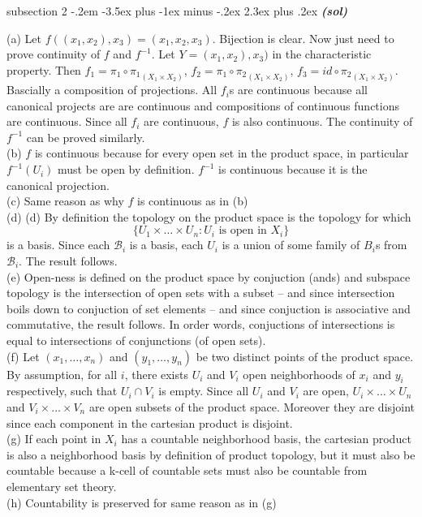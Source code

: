 \documentclass[12pt]{article}
\makeatletter
\newenvironment{s}{\@startsection
       {subsection}
       {2}
       {-.2em}
       {-3.5ex plus -1ex minus -.2ex}
       {2.3ex plus .2ex}
       {\pagebreak[3]%
       \large\bf\noindent\emph{(sol) }
       }
       }
\makeatother
\begin{document}
\begin{s}{3.32}
    (a) Let $f((x_1,x_2),x_3) = (x_1,x_2,x_3)$. Bijection is clear. Now just need to prove continuity 
    of $f$ and $f^{-1}$. Let $Y= (x_1,x_2),x_3)$ in the characteristic property. Then 
    $f_1 = \pi_1 \circ {\pi_1}_{(X_1 \times X_2)}$, $f_2 = \pi_1 \circ {\pi_2}_{(X_1 \times X_2)}$,
    $f_3 = id \circ  {\pi_2}_{(X_1 \times X_2)}$. Bascially a composition of projections.
    All $f_i$s are continuous because all canonical projects are are continuous and compositions of 
    continuous functions are continuous. Since all $f_i$ are continuous, $f$ is also continuous.
    The continuity of $f^{-1}$ can be proved similarly.\\
    (b) $f$ is continuous because for every open set in the product space, in particular $f^{-1}(U_i)$
    must be open by definition. $f^{-1}$ is continuous because it is the canonical projection.\\
    (c) Same reason as why $f$ is continuous as in (b)\\
    (d) (d) By definition the topology on the product space is the topology for which 
    $$\{U_1\times \dots \times U_n : U_i \text{ is open in } X_i\}$$
    is a basis. Since each $\mathscr{B}_i$ is a basis, each $U_i$ is a union of some family of 
    $B_i$s from $\mathscr{B}_i$. The result follows.\\
    (e) Open-ness is defined on the product space by conjuction (ands) and subspace topology is the intersection
    of open sets with a subset -- and since intersection boils down to conjuction of set elements -- and since 
    conjuction is associative and commutative, the result follows. In order words, conjuctions of intersections 
    is equal to intersections of conjunctions (of open sets).\\
    (f) Let $(x_1,\dots,x_n)$ and $(y_1,\dots,y_n)$ be two distinct points of the product space. By assumption,
    for all $i$, there exists $U_i$ and $V_i$ open neighborhoods of $x_i$ and $y_i$ respectively, such that
    $U_i \cap V_i$ is empty. Since all $U_i$ and $V_i$ are open, $U_i \times \dots \times U_n$ and 
    $V_i \times \dots \times V_n$  are open subsets of the product space. Moreover they are disjoint since each 
    component in the cartesian product is disjoint.\\
    (g) If each point in $X_i$ has a countable neighborhood basis, the cartesian product is also a neighborhood
    basis by definition of product topology, but it must also be countable because a k-cell of countable sets must
    also be countable from elementary set theory.\\
    (h) Countability is preserved for same reason as in (g)
\end{s}
\end{document}

